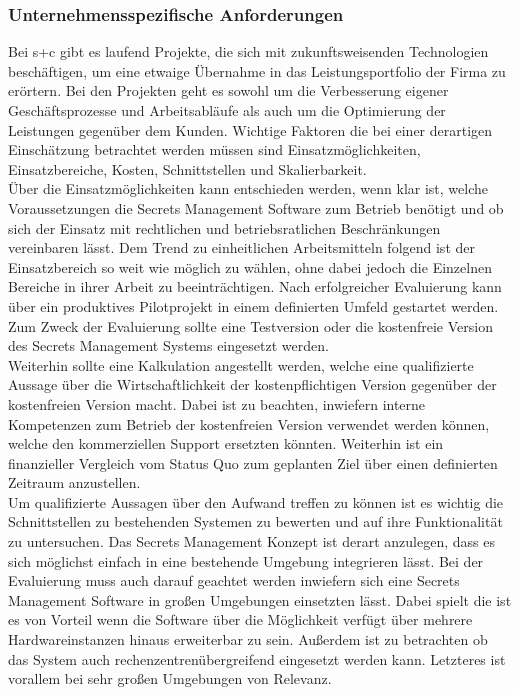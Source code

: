 \documentclass[
book,
a4paper,   
titlepage,  
halfparskip,
12pt        
]{scrartcl}
\begin{document}
\begin{onehalfspacing}
\subsubsection{Unternehmensspezifische Anforderungen}
Bei s+c gibt es laufend Projekte, die sich mit zukunftsweisenden Technologien beschäftigen, um eine etwaige Übernahme in das Leistungsportfolio der Firma zu erörtern. Bei den Projekten geht es sowohl um die Verbesserung eigener Geschäftsprozesse und Arbeitsabläufe als auch um die Optimierung der Leistungen gegenüber dem Kunden. Wichtige Faktoren die bei einer derartigen Einschätzung betrachtet werden müssen sind Einsatzmöglichkeiten, Einsatzbereiche, Kosten, Schnittstellen und Skalierbarkeit. \\                                                                                                                                                                                                                                                                                                                                                                                                                     
Über die Einsatzmöglichkeiten kann entschieden werden, wenn klar ist, welche Voraussetzungen die Secrets Management Software zum Betrieb benötigt und ob sich der Einsatz mit rechtlichen und betriebsratlichen Beschränkungen vereinbaren lässt. Dem Trend zu einheitlichen Arbeitsmitteln folgend ist der Einsatzbereich so weit wie möglich zu wählen, ohne dabei jedoch die Einzelnen Bereiche in ihrer Arbeit zu beeinträchtigen. Nach erfolgreicher Evaluierung kann über ein produktives Pilotprojekt in einem definierten Umfeld gestartet werden. Zum Zweck der Evaluierung sollte eine Testversion oder die kostenfreie Version des Secrets Management Systems eingesetzt werden.\\
Weiterhin sollte eine Kalkulation angestellt werden, welche eine qualifizierte Aussage über die Wirtschaftlichkeit der kostenpflichtigen Version gegenüber der kostenfreien Version macht. Dabei ist zu beachten,  inwiefern interne Kompetenzen zum Betrieb der kostenfreien Version verwendet werden können, welche den kommerziellen Support ersetzten könnten. Weiterhin ist ein finanzieller Vergleich vom Status Quo zum geplanten Ziel über einen definierten Zeitraum anzustellen.\\ 
Um qualifizierte Aussagen über den Aufwand treffen zu können ist es wichtig die Schnittstellen zu bestehenden Systemen zu bewerten und auf ihre Funktionalität zu untersuchen. Das Secrets Management Konzept ist derart anzulegen, dass es sich möglichst einfach in eine bestehende Umgebung integrieren lässt. Bei der Evaluierung muss auch darauf geachtet werden inwiefern sich eine Secrets Management Software in großen Umgebungen einsetzten lässt. Dabei spielt die ist es von Vorteil wenn die Software über die Möglichkeit verfügt über mehrere Hardwareinstanzen hinaus erweiterbar zu sein. Außerdem ist zu betrachten ob das System auch rechenzentrenübergreifend eingesetzt werden kann. Letzteres ist vorallem bei sehr großen Umgebungen von Relevanz.
\newpage

\end{onehalfspacing}
\end{document}
